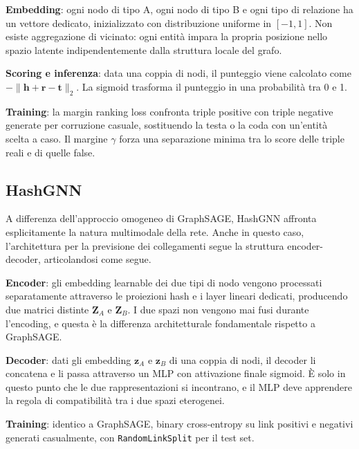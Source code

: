 \textbf{Embedding}: ogni nodo di tipo A, ogni nodo di tipo B e ogni tipo di relazione ha un vettore dedicato, inizializzato con distribuzione uniforme in $[-1, 1]$. Non esiste aggregazione di vicinato: ogni entità impara la propria posizione nello spazio latente indipendentemente dalla struttura locale del grafo.

\textbf{Scoring e inferenza}: data una coppia di nodi, il punteggio viene calcolato come $-\|\mathbf{h} + \mathbf{r} - \mathbf{t}\|_2$. La sigmoid trasforma il punteggio in una probabilità tra 0 e 1.

\textbf{Training}: la margin ranking loss confronta triple positive con triple negative generate per corruzione casuale, sostituendo la testa o la coda con un'entità scelta a caso. Il margine $\gamma$ forza una separazione minima tra lo score delle triple reali e di quelle false.

\subsection{HashGNN}
A differenza dell'approccio omogeneo di GraphSAGE, HashGNN affronta esplicitamente la natura multimodale della rete. Anche in questo caso, l'architettura per la previsione dei collegamenti segue la struttura encoder-decoder, articolandosi come segue.

\textbf{Encoder}: gli embedding learnable dei due tipi di nodo vengono processati separatamente attraverso le proiezioni hash e i layer lineari dedicati, producendo due matrici distinte $\mathbf{Z}_A$ e $\mathbf{Z}_B$. I due spazi non vengono mai fusi durante l'encoding, e questa è la differenza architetturale fondamentale rispetto a GraphSAGE.

\textbf{Decoder}: dati gli embedding $\mathbf{z}_{A}$ e $\mathbf{z}_{B}$ di una coppia di nodi, il decoder li concatena e li passa attraverso un MLP con attivazione finale sigmoid. È solo in questo punto che le due rappresentazioni si incontrano, e il MLP deve apprendere la regola di compatibilità tra i due spazi eterogenei.

\textbf{Training}: identico a GraphSAGE, binary cross-entropy su link positivi e negativi generati casualmente, con \texttt{RandomLinkSplit} per il test set.

